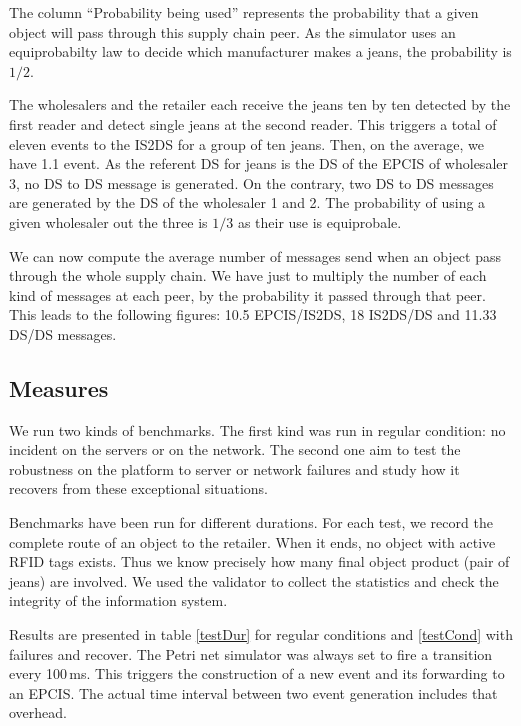 \documentclass[a4paper]{llncs}
\begin{document}
The column ``Probability being used'' represents the probability that a given object will
pass through this supply chain peer. As the simulator uses an equiprobabilty law
to decide which manufacturer makes a jeans, the probability is $1/2$.

The wholesalers and the retailer each receive the jeans ten by ten
detected by the first reader 
and detect single jeans at the second  reader. This triggers a total of eleven
events to the IS2DS for a group of ten jeans. Then, on the average, we have 1.1 event.
As the referent DS for jeans is the DS of the EPCIS of wholesaler 3, no
DS to DS message is generated. On the contrary, two DS to DS messages are
generated by the DS of the wholesaler 1 and 2.  The probability of using a
given wholesaler out the three is $1/3$ as their use is equiprobale.

We can now compute the average number of messages send when an object pass
through the whole supply chain. We have just to multiply the number of each
kind of messages at each peer, by the probability it passed through that peer.
This leads to the following figures: 10.5 EPCIS/IS2DS, 18 IS2DS/DS and 11.33 DS/DS
messages. 


\subsection{Measures}

We run two kinds of benchmarks.  The first kind was run in regular condition:
no incident on the servers or on the network. The second one aim to test the
robustness  on the platform to server or network failures and study how it
recovers from these exceptional situations.

Benchmarks have been run for different durations. For each test, we record the
complete route of an object to the retailer. When it ends, no
object with active RFID tags exists. Thus we know precisely how many final
object product (pair of jeans) are involved. We used the validator to collect
the statistics and check the integrity of the information system.

Results are presented in table \ref{testDur} for regular conditions and
\ref{testCond} with failures and recover. The Petri net simulator was always
set to fire a transition every 100\,ms. This triggers the construction of a new
event and its forwarding to an EPCIS.  The actual time interval between two
event generation includes that overhead.
\end{document}
